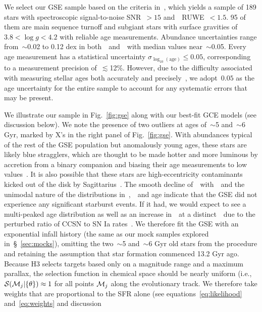 We select our GSE sample based on the criteria in~\citet{Conroy2022}, which
yields a sample of 189 stars with spectroscopic signal-to-noise
SNR~$> 15$ and~\gaia~RUWE~$< 1.5$.
95 of them are main sequence turnoff and subgiant stars with surface gravities
of~$3.8 < \log g < 4.2$ with reliable age measurements.
Abundance uncertainties range from~$\sim$0.02 to 0.12 dex in
both~\feh~and~\afe~with median values near~$\sim$0.05.
Every age measurement has a statistical uncertainty
$\sigma_{\log_{10}(\text{age})} \leq 0.05$, corresponding to a measurement
precision of~$\lesssim$12\%.
However, due to the difficulty associated with measuring stellar ages both
accurately and precisely~\citep[e.g.,][]{Soderblom2010, Chaplin2013, Angus2019},
we adopt~$0.05$ as the age uncertainty for the entire sample to account for any
systematic errors that may be present.
\par
We illustrate our sample in Fig.~\ref{fig:gse} along with our best-fit GCE
models (see discussion below).
We note the presence of two outliers at ages of~$\sim$5 and~$\sim$6 Gyr, marked
by X's in the right panel of Fig.~\ref{fig:gse}.
With abundances typical of the rest of the GSE population but anomalously young
ages, these stars are likely blue stragglers, which are thought to be made
hotter and more luminous by accretion from a binary companion and biasing their
age measurements to low values~\citep[e.g.,][]{Bond1971, Stryker1993}.
It is also possible that these stars are high-eccentricity contaminants kicked
out of the disk by Sagittarius~\citep[e.g.,][]{Donlon2020}.
The smooth decline of~\afe~with~\feh~and the unimodal nature of the
distributions in~\feh,~\afe~and age indicate that the GSE did not experience
any significant starburst events.
If it had, we would expect to see a multi-peaked age distribution
as well as an increase in~\afe~at a distinct~\feh~due to the perturbed ratio of
CCSN to SN Ia rates~\citep{Johnson2020}.
We therefore fit the GSE with an exponential infall history (the same as our
mock samples explored in~\S~\ref{sec:mocks}), omitting the two~$\sim$5
and~$\sim$6 Gyr old stars from the procedure and retaining the assumption that
star formation commenced 13.2 Gyr ago.
Because H3 selects targets based only on a magnitude range and a maximum
parallax, the selection function in chemical space should be nearly uniform
(i.e.,~$\mathcal{S}(\mathcal{M}_j | \{\theta\}) \approx 1$ for all points
$\mathcal{M}_j$ along the evolutionary track.
We therefore take weights that are proportional to the SFR alone (see
equations~\ref{eq:likelihood} and~\ref{eq:weights} and discussion
